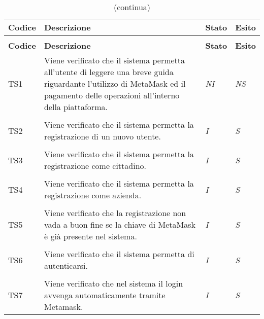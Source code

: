 	\begin{longtable}{ >{\centering}p{} >{}p{}
			>{\centering}p{} >{\centering}p{}}
			
		\caption{Riepilogo test di sistema}\\	
		\rowcolorhead
		\textbf{\color{white}Codice} 
		& \centering\textbf{\color{white}Descrizione} 
		& \centering\textbf{\color{white}Stato}
		& \centering\textbf{\color{white}Esito} 
		\tabularnewline %
		\endfirsthead	
		
		\rowcolor{white}\caption[]{(continua)}\\	
		\rowcolorhead
		\textbf{\color{white}Codice} 
		& \centering\textbf{\centering\color{white}Descrizione} 
		& \centering\textbf{\color{white}Stato}
		& \centering\textbf{\color{white}Esito} 
		\tabularnewline %
		\endhead	
		

		\hypertarget{TS1}{TS1} & Viene verificato che il sistema permetta all'utente 
		di leggere una breve guida riguardante l'utilizzo di MetaMask ed il pagamento 
		delle operazioni all'interno della piattaforma. & \textit{NI} & \textit{NS}\\ 

		\tabularnewline
		\hypertarget{TS2}{TS2} & Viene verificato che il sistema permetta la 
		registrazione di un nuovo utente. & \textit{I} & \textit{S}\\ 

		\tabularnewline
		\hypertarget{TS3}{TS3} & Viene verificato che il sistema permetta la 
		registrazione come cittadino. & \textit{I} & \textit{S}\\ 

		\tabularnewline
		\hypertarget{TS4}{TS4} & Viene verificato che il sistema permetta la 
		registrazione come azienda. & \textit{I} & \textit{S}\\ 

		\tabularnewline
		\hypertarget{TS5}{TS5} & Viene verificato che la registrazione non vada 
		a buon fine se la chiave di MetaMask è già presente nel sistema. & 
		\textit{I} & \textit{S}\\  

		\tabularnewline
		\hypertarget{TS6}{TS6} & Viene verificato che il sistema permetta di 
		autenticarsi. & \textit{I} & \textit{S}\\ 

		\tabularnewline
		\hypertarget{TS7}{TS7} & Viene verificato che nel sistema il login 
		avvenga automaticamente tramite Metamask. & \textit{I} & \textit{S}\\ 


\end{longtable}
